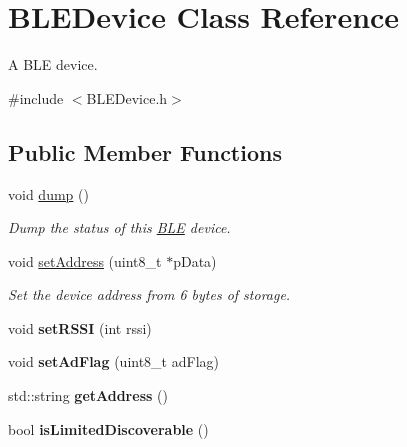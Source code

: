 \hypertarget{class_b_l_e_device}{}\section{B\+L\+E\+Device Class Reference}
\label{class_b_l_e_device}


A B\+LE device.  




{\ttfamily \#include $<$B\+L\+E\+Device.\+h$>$}

\subsection*{Public Member Functions}
\begin{DoxyCompactItemize}
\item 
void \hyperlink{class_b_l_e_device_a650aada692e52d54376e632d81f8ac40}{dump} ()\hypertarget{class_b_l_e_device_a650aada692e52d54376e632d81f8ac40}{}\label{class_b_l_e_device_a650aada692e52d54376e632d81f8ac40}

\begin{DoxyCompactList}\small\item\em Dump the status of this \hyperlink{class_b_l_e}{B\+LE} device. \end{DoxyCompactList}\item 
void \hyperlink{class_b_l_e_device_a7c1836e7eac318d643169ce80d95c18e}{set\+Address} (uint8\+\_\+t $\ast$p\+Data)
\begin{DoxyCompactList}\small\item\em Set the device address from 6 bytes of storage. \end{DoxyCompactList}\item 
void {\bfseries set\+R\+S\+SI} (int rssi)\hypertarget{class_b_l_e_device_a39e8d59ebab8b0bdf70169ddcc6da2fa}{}\label{class_b_l_e_device_a39e8d59ebab8b0bdf70169ddcc6da2fa}

\item 
void {\bfseries set\+Ad\+Flag} (uint8\+\_\+t ad\+Flag)\hypertarget{class_b_l_e_device_aa3b866720c0d6516e4dd20b8299314b9}{}\label{class_b_l_e_device_aa3b866720c0d6516e4dd20b8299314b9}

\item 
std\+::string {\bfseries get\+Address} ()\hypertarget{class_b_l_e_device_a5d9954069757af65b571a154420d5a45}{}\label{class_b_l_e_device_a5d9954069757af65b571a154420d5a45}

\item 
bool {\bfseries is\+Limited\+Discoverable} ()\hypertarget{class_b_l_e_device_a9c88313fce2e1add75ba476e337993c7}{}\label{class_b_l_e_device_a9c88313fce2e1add75ba476e337993c7}


\end{DoxyCompactItemize}
